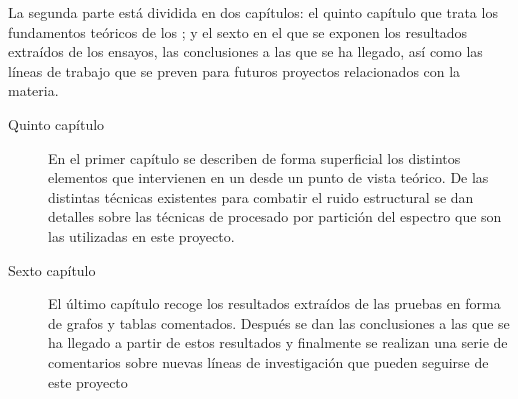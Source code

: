 La segunda parte está dividida en dos capítulos: el quinto capítulo que trata los fundamentos teóricos de los ; y el sexto en el que se exponen los resultados extraídos de los ensayos, las conclusiones a las que se ha llegado, así como las líneas de trabajo que se preven para futuros proyectos relacionados con la materia.%


\begin{description}
	\item[Quinto capítulo] En el primer capítulo se describen de forma superficial los distintos elementos que intervienen en un  desde un punto de vista teórico. De las distintas técnicas existentes para combatir el ruido estructural se dan detalles sobre las técnicas de procesado por partición del espectro que son las utilizadas en este proyecto.
	\item[Sexto capítulo] El último capítulo recoge los resultados extraídos de las pruebas en forma de grafos y tablas comentados. Después se dan las conclusiones a las que se ha llegado a partir de estos resultados y finalmente se realizan una serie de comentarios sobre nuevas líneas de investigación que pueden seguirse de este proyecto
\end{description}


